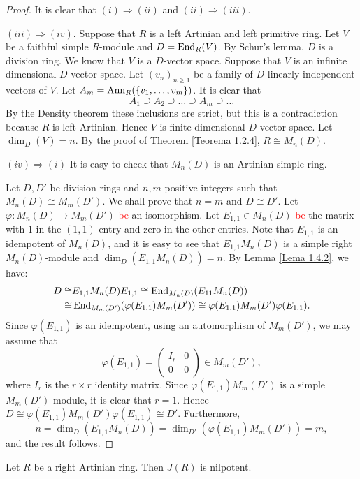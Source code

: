 \begin{proof}
It is clear that $(i)\Rightarrow (ii)$ and $(ii)\Rightarrow (iii)$.

$(iii)\Rightarrow (iv)$. Suppose that $R$ is a left Artinian and left primitive ring. Let $V$ be a faithful simple $R$-module
and $D=\operatorname{End}_R(V)$. By Schur's lemma, $D$ is a division ring.
We know that $V$ is a $D$-vector space.
Suppose that $V$ is an infinite dimensional $D$-vector space. Let $( v_n)_{n\geq 1}$ be a family of 
$D$-linearly independent vectors of $V$. Let $A_m=\operatorname{Ann}_R(\{
v_1,\dots,v_m\} )$. It is clear that
$$A_1\supseteq A_2\supseteq\dots\supseteq A_m\supseteq\dots$$
By the Density theorem these inclusions are strict, but this is a contradiction because $R$ is left Artinian. Hence $V$ 
is finite dimensional $D$-vector space. Let  $\dim_D(V)=n$. By the proof of Theorem \ref{Teorema 1.2.4}, $R\cong M_n(D)$.

$(iv)\Rightarrow (i)$ It is easy to check that $M_n(D)$ is an Artinian simple ring.

Let $D,D'$ be division rings and $n,m$ positive integers such that
$M_n(D)\cong M_m(D')$. We shall prove that $n=m$ and $D\cong D'$. Let
$\varphi\colon M_n(D)\rightarrow M_m(D')$ \textcolor{red}{be} an isomorphism. Let
$E_{1,1}\in M_n(D)$ \textcolor{red}{be} the matrix with $1$ in the $(1,1)$-entry and zero in the other entries. Note that $E_{1,1}$ is an idempotent of $M_n(D)$, and it is easy to see that $E_{1,1}M_n(D)$ is a simple right $M_n(D)$-module and $\dim_D(E_{1,1}M_n(D))=n$. By Lemma \ref{Lema 1.4.2}, we have:
\begin{align*} D\cong&
E_{1,1}M_n(D)E_{1,1}\cong\operatorname{End}_{M_n(D)}(E_{11}M_n(D))\\
\cong&
\operatorname{End}_{M_m(D')}(\varphi (E_{1,1})M_m(D'))\cong \varphi
(E_{1,1})M_m(D')\varphi (E_{1,1}).
\end{align*}
Since $\varphi (E_{1,1})$ is an idempotent, using an automorphism of $M_m(D')$, we may assume that
$$\varphi (E_{1,1})=\left(\begin{array}{cc} I_r&0\\
0&0\end{array}\right)\in M_m(D'),$$
where $I_r$ is the $r\times r$ identity  matrix. Since $\varphi
(E_{1,1})M_m(D')$ is a simple $M_m(D')$-module, it is clear that $r=1$. Hence $D\cong \varphi (E_{1,1})M_m(D')\varphi (E_{1,1})\cong D'$.
Furthermore,
$$n=\dim_D(E_{1,1}M_n(D))=\dim_{D'}(\varphi
(E_{1,1})M_m(D'))=m,$$
and the result follows.
\end{proof}

\begin{theorem}\label{Teorema 1.4.4}
Let $R$ be a right Artinian ring. Then $J(R)$ is nilpotent.
\end{theorem}

